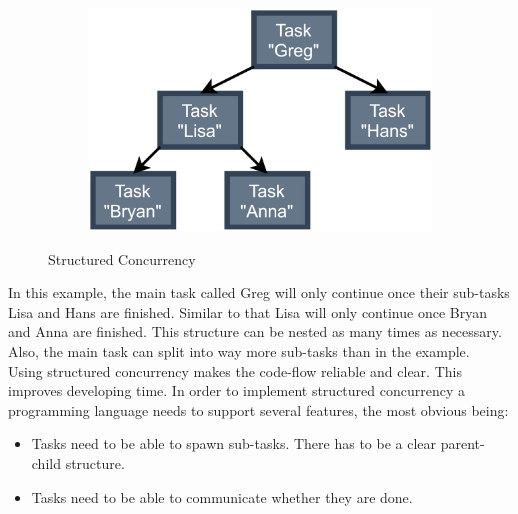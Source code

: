\begin{figure}[H]
  \centering
  \begin{subfigure}[b]{0.4\textwidth}
    \includegraphics[width=1.0\linewidth]{img/structured-concurrency.png}
  \end{subfigure}
  \caption{Structured Concurrency}
  \label{Structured Concurrency}
\end{figure}
In this example, the main task called Greg will only continue once their sub-tasks Lisa and Hans are finished. Similar to that Lisa will only continue once Bryan and Anna are finished.
This structure can be nested as many times as necessary. Also, the main task can split into way more sub-tasks than in the example.
\\
Using structured concurrency makes the code-flow reliable and clear. This improves developing time. In order to implement structured concurrency a programming language needs to support several features, the most obvious being:
\begin{itemize}
  \item Tasks need to be able to spawn sub-tasks. There has to be a clear parent-child structure.
  \item Tasks need to be able to communicate whether they are done.
\end{itemize}

\cite{wiki:structured-concurrency}
\cite{loom:structured-concurrency}


